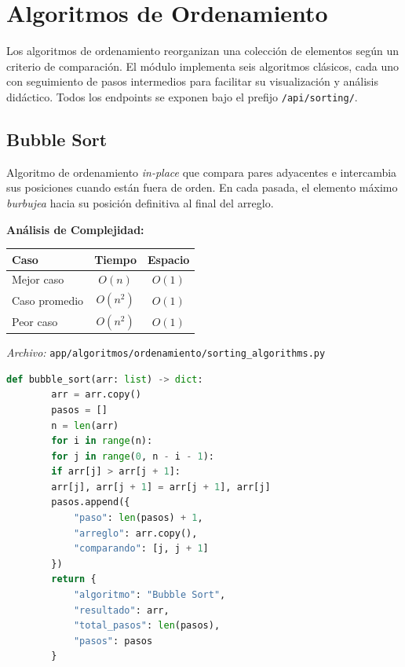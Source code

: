 \documentclass[12pt, letterpaper]{article}
\begin{document}
	\newpage
	\tableofcontents
	\newpage
	
	\section{Algoritmos de Ordenamiento}
	Los algoritmos de ordenamiento reorganizan una colección de elementos según un criterio de comparación. El módulo implementa seis algoritmos clásicos, cada uno con seguimiento de pasos intermedios para facilitar su visualización y análisis didáctico. Todos los endpoints se exponen bajo el prefijo \texttt{/api/sorting/}.
	
	\subsection{Bubble Sort}
	Algoritmo de ordenamiento \textit{in-place} que compara pares adyacentes e intercambia sus posiciones cuando están fuera de orden. En cada pasada, el elemento máximo \textit{burbujea} hacia su posición definitiva al final del arreglo.
	
	\textbf{Análisis de Complejidad:}
	\begin{table}[h]
		\centering
		\begin{tabular}{@{}lcc@{}}
			\toprule
			\textbf{Caso} & \textbf{Tiempo} & \textbf{Espacio} \\ \midrule
			Mejor caso    & $O(n)$          & $O(1)$ \\
			Caso promedio & $O(n^2)$        & $O(1)$ \\
			Peor caso     & $O(n^2)$        & $O(1)$ \\ \bottomrule
		\end{tabular}
	\end{table}
	
	\textit{Archivo:} \texttt{app/algoritmos/ordenamiento/sorting\_algorithms.py}
	
	\begin{lstlisting}[language=Python, caption={Implementacion de Bubble Sort}]
		def bubble_sort(arr: list) -> dict:
		arr = arr.copy()
		pasos = []
		n = len(arr)
		for i in range(n):
		for j in range(0, n - i - 1):
		if arr[j] > arr[j + 1]:
		arr[j], arr[j + 1] = arr[j + 1], arr[j]
		pasos.append({
			"paso": len(pasos) + 1,
			"arreglo": arr.copy(),
			"comparando": [j, j + 1]
		})
		return {
			"algoritmo": "Bubble Sort",
			"resultado": arr,
			"total_pasos": len(pasos),
			"pasos": pasos
		}
	\end{lstlisting}
	
\end{document}
